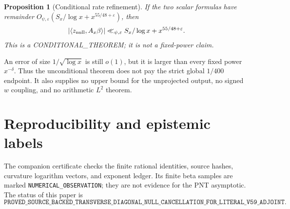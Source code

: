 \documentclass[10pt]{article}
\newtheorem{proposition}[theorem]{Proposition}
\newcommand{\ip}[2]{\langle #1,#2\rangle}
\newcommand{\Ax}{A_x}
\newcommand{\e}{\varepsilon}
\begin{document}
\begin{proposition}[Conditional rate refinement]\label{prop:nullrate}
If the two scalar formulas have remainder
\(O_{\psi,\e}(S_x/\log x+x^{55/48+\e})\), then
\[
 |\ip{z_{\rm null}}{\Ax\beta}|
 \ll_{\psi,\e}S_x/\log x+x^{55/48+\e}.
\]
This is a \textup{CONDITIONAL\_THEOREM}; it is not a fixed-power claim.
\end{proposition}

An error of size \(1/\sqrt{\log x}\) is still \(o(1)\), but it is larger
than every fixed power \(x^{-\delta}\).  Thus the unconditional theorem
does not pay the strict global \(1/400\) endpoint.  It also supplies no
upper bound for the unprojected output, no signed \(w\) coupling, and no
arithmetic \(L^2\) theorem.

\section*{Reproducibility and epistemic labels}

The companion certificate checks the finite rational identities, source hashes,
curvature logarithm vectors, and exponent ledger.  Its finite beta samples are
marked \texttt{NUMERICAL\_OBSERVATION}; they are not evidence for the PNT
asymptotic.  The status of this paper is
\[
\texttt{PROVED\_SOURCE\_BACKED\_TRANSVERSE\_DIAGONAL\_NULL\_CANCELLATION\_FOR\_LITERAL\_V59\_ADJOINT}.
\]



\end{document}

